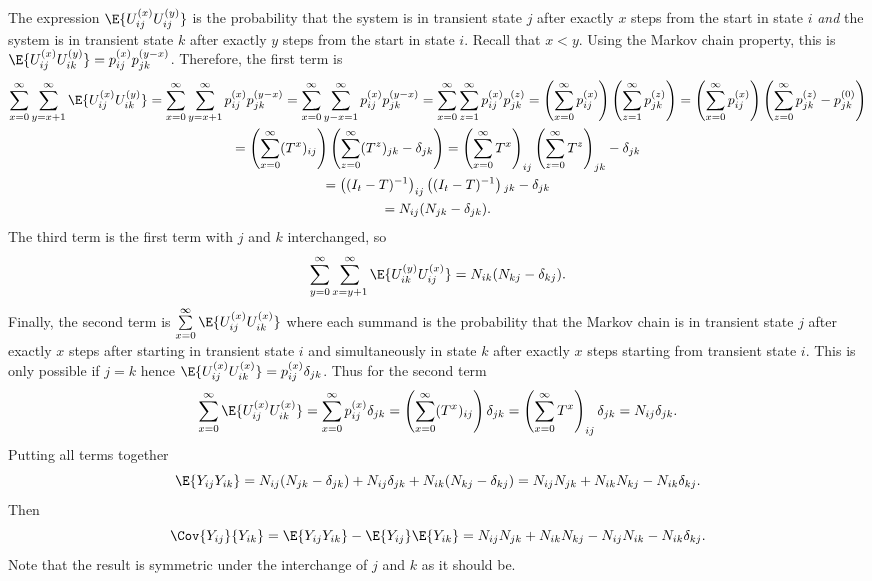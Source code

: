 \documentclass[12pt]{article}
\begin{document}
The expression \( \E{U_{ij}^{(x)} U_{ij}^{(y)}} \) is the probability
that the system is in transient state \( j \) after exactly \( x \)
steps from the start in state \( i \) \emph{and} the system is in transient
state \( k \) after exactly \( y \) steps from the start in state \( i
\).  Recall that \( x < y \).
Using the Markov chain property, this is \( \E{U_{ij}^{(x)} U_{ik}^{(y)}}
= p_{ij}^{(x)} p_{jk}^{(y-x)} \).  Therefore, the first term is
\begin{multline*}
    \sum\limits_{x=0}^{\infty} \sum\limits_{y=x+1}^{\infty} \E{U_{ij}^{(x)}
    U_{ik}^{(y)}} = \sum\limits_{x=0}^{\infty} \sum\limits_{y=x+1}^{\infty}
    p_{ij}^{(x)} p_{jk}^{(y-x)}
    = \sum\limits_{x=0}^{\infty} \sum\limits_{y-x=1}^{\infty} p_{ij}^{%
    (x)} p_{jk}^{(y-x)}
    = \sum\limits_{x=0}^{\infty} \sum\limits_{z=1}^{\infty} p_{ij}^{(x)}
    p_{jk}^{(z)}
    = \left( \sum\limits_{x=0}^{\infty} p_{ij}^{(x)} \right) \left(
    \sum\limits_{z=1}^{\infty} p_{jk}^{(z)} \right)
     = \left( \sum\limits_{x=0}^{\infty} p_{ij}^{(x)} \right) \left(
    \sum\limits_{z=0}^{\infty} p_{jk}^{(z)} - p_{jk}^{(0)}\right) \\
     = \left( \sum\limits_{x=0}^{\infty} (T^x){}_{ij} \right) \left(
    \sum\limits_{z=0}^{\infty} (T^z){}_{jk} - \delta_{jk}\right)
     = \left( \sum\limits_{x=0}^{\infty} T^x \right)_{ij} \left(
    \sum\limits_{z=0}^{\infty} T^z\right)_{jk} - \delta_{jk} \\
     = \left( (I_t-T)^{-1} \right)_{ij} \left( (I_t-T)^{-1} \right){}_{jk}
    - \delta_{jk} \\
    = N_{ij}(N_{jk}-\delta_{jk}).
\end{multline*}
The third term is the first term with \( j \) and \( k \) interchanged,
so
\[
    \sum\limits_{y=0}^{\infty} \sum\limits_{x=y+1}^{\infty} \E{U_{ik}^{(y)}
    U_{ij}^{(x)}} = N_{ik}(N_{kj}-\delta_{kj}).
\] Finally, the second term is \( \sum\limits_{x=0}^{\infty} \E{U_{ij}^{(x)}
U_{ik}^{(x)}} \) where each summand is the probability that the Markov
chain is in transient state \( j \) after exactly \( x \) steps after
starting in transient state \( i \) and simultaneously in state \( k \)
after exactly \( x \) steps starting from transient state \( i \).  This
is only possible if \( j=k \) hence \( \E{U_{ij}^{(x)} U_{ik}^{(x)}} = p_{ij}^{(x)}
\delta_{jk} \).  Thus for the second term
\[
    \sum\limits_{x=0}^{\infty} \E{U_{ij}^{(x)} U_{ik}^{(x)}} = \sum\limits_{x=0}^
    {\infty} p_{ij}^{(x)} \delta_{jk} = \left( \sum\limits_{x=0}^{\infty} (T^
    {x}){}_{ij} \right) \delta_{jk} = \left( \sum\limits_{x=0}^{\infty}
    T^{x} \right)_{ij} \delta_{jk} = N_{ij} \delta_{jk}.
\] Putting all terms together
\[
    \E{Y_{ij} Y_{ik}} = N_{ij}(N_{jk}-\delta_{jk}) + N_{ij} \delta_{jk}
    + N_{ik}(N_{kj}-\delta_{kj}) = N_{ij}N_{jk} + N_{ik}N_{kj} - N_{ik}\delta_
    {kj}.
\] Then
\begin{equation}
    \Cov{Y_{ij}}{Y_{ik}} = \E{Y_{ij} Y_{ik}} - \E{Y_{ij}} \E{Y_{ik}} = N_
    {ij}N_{jk} + N_{ik}N_{kj} - N_{ij}N_{ik} - N_{ik}\delta_{kj}.
     \label{eq:newwaitingtime:cov}
\end{equation}
Note that the result is symmetric under the interchange of \( j \) and
\( k \) as it should be.
\end{document}
